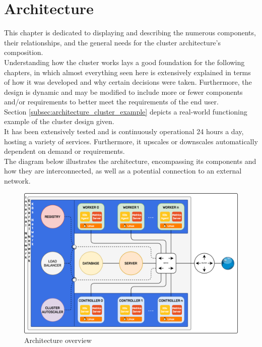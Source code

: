 \chapter{Architecture}
\label{cha:architecture}

This chapter is dedicated to displaying and describing the numerous components,
their relationships, and the general needs for the cluster architecture's composition.
\\ %
Understanding how the cluster works lays a good foundation for the following chapters,
in which almost everything seen here is extensively explained in terms of how it
was developed and why certain decisions were taken. Furthermore, the design is
dynamic and may be modified to include more or fewer components and/or
requirements to better meet the requirements of the end user. \\ %
Section \ref{subsec:architecture_cluster_example} depicts a real-world
functioning example of the cluster design given. \\ %
It has been extensively tested and is continuously operational 24 hours a day, hosting
a variety of services. Furthermore, it upscales or downscales automatically dependent
on demand or requirements. \\ %
The diagram below illustrates the architecture, encompassing its components and
how they are interconnected, as well as a potential connection to an external network.

\begin{figure}[htbp]
  \centering
  \includegraphics[width=\textwidth]{images/recluster/architecture.png}
  \caption{Architecture overview}
\end{figure}


